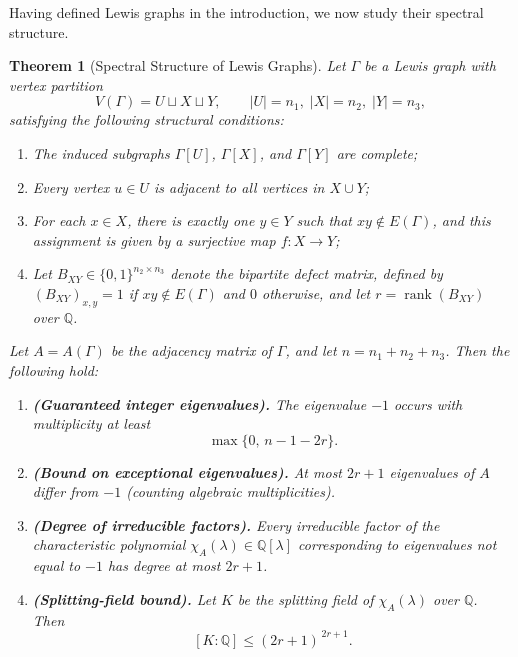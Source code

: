 \documentclass[11pt]{amsart}
\newtheorem{thm}{\bf Theorem}[section]
\begin{document}
Having defined Lewis graphs in the introduction, we now study their spectral structure.
\begin{thm}[Spectral Structure of Lewis Graphs]\label{thm:LewisSpectralCorrected}
Let $\Gamma$ be a Lewis graph with vertex partition
\[
V(\Gamma)=U\sqcup X\sqcup Y, \qquad |U|=n_1,\; |X|=n_2,\; |Y|=n_3,
\]
satisfying the following structural conditions:
\begin{enumerate}[label=\upshape(\roman*)]
    \item The induced subgraphs $\Gamma[U]$, $\Gamma[X]$, and $\Gamma[Y]$ are complete;
    \item Every vertex $u\in U$ is adjacent to all vertices in $X\cup Y$;
    \item For each $x\in X$, there is exactly one $y\in Y$ such that $xy\notin E(\Gamma)$, and this assignment is given by a surjective map $f\colon X\to Y$;
    \item Let $B_{XY}\in\{0,1\}^{n_2\times n_3}$ denote the \emph{bipartite defect matrix}, defined by $(B_{XY})_{x,y}=1$ if $xy\notin E(\Gamma)$ and $0$ otherwise, and let $r=\operatorname{rank}(B_{XY})$ over $\mathbb{Q}$.
\end{enumerate}
Let $A=A(\Gamma)$ be the adjacency matrix of $\Gamma$, and let $n = n_1+n_2+n_3$. Then the following hold:
\begin{enumerate}[label=\upshape(\alph*)]
    \item \textbf{(Guaranteed integer eigenvalues).}
    The eigenvalue $-1$ occurs with multiplicity at least
    \[
      \max\{0,\, n - 1 - 2r\}.
    \]
    \item \textbf{(Bound on exceptional eigenvalues).}
    At most $2r+1$ eigenvalues of $A$ differ from $-1$ (counting algebraic multiplicities).
    \item \textbf{(Degree of irreducible factors).}
    Every irreducible factor of the characteristic polynomial $\chi_A(\lambda)\in\mathbb{Q}[\lambda]$ corresponding to eigenvalues not equal to $-1$ has degree at most $2r+1$.
    \item \textbf{(Splitting-field bound).}
    Let $K$ be the splitting field of $\chi_A(\lambda)$ over $\mathbb{Q}$. Then
    \[
      [K:\mathbb{Q}] \leq (2r+1)^{\,2r+1}.
    \]
\end{enumerate}
\end{thm}
\end{document}
